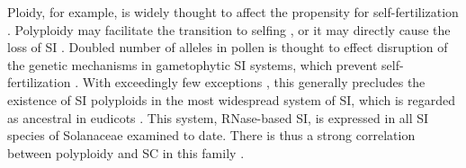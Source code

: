 Ploidy, for example, is widely thought to affect the propensity for self-fertilization \citep{stebbins1950}. 
Polyploidy may facilitate the transition to selfing \citep{barringer2007, barrett2008, husband2008}, or it may directly cause the loss of SI \citep{stout1942, lewis1947}.
Doubled number of alleles in pollen is thought to effect disruption of the genetic mechanisms in gametophytic SI systems, which prevent self-fertilization \citep{entani1999, tsukamoto2005, kubo2010}. 
With exceedingly few exceptions \citep{hauck_2002,nunes_2006}, this generally precludes the existence of SI polyploids in the most widespread system of SI, which is regarded as ancestral in eudicots \citep{igic_2001,steinbachs_2002}.
This system, RNase-based SI, is expressed in all SI species of Solanaceae examined to date.
There is thus a strong correlation between polyploidy and SC in this family \citep{robertson_2011}.

